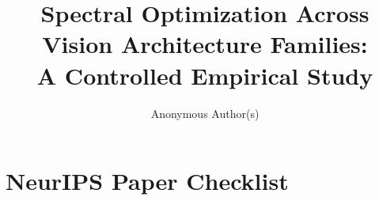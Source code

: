 \documentclass{article}
\title{Spectral Optimization Across Vision Architecture Families:\\A Controlled Empirical Study}
\author{
  Anonymous Author(s)
}
\begin{document}
\maketitle






















\section*{NeurIPS Paper Checklist}
\end{document}
